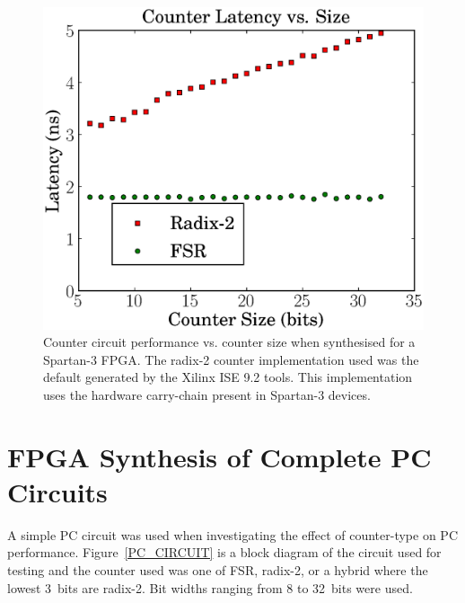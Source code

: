 \documentclass[5p, twocolumn]{elsarticle}
\begin{document}
\begin{figure}[ht!]
\begin{center}
\includegraphics[width=\linewidth]{graphs/counter_performance.eps}
\caption[Counter performance vs. counter size]{Counter
circuit performance vs. counter size when synthesised for a Spartan-3 FPGA.
The radix-2 counter implementation used was the default generated by the
Xilinx ISE 9.2 tools. This implementation uses the hardware carry-chain
present in Spartan-3 devices.}
\label{GRAPH_COUNTERS}
\end{center}
\end{figure}



%
\section{FPGA Synthesis of Complete PC Circuits}

A simple PC circuit was used when investigating the effect of counter-type on PC
performance. Figure~\ref{PC_CIRCUIT} is a block diagram of the circuit used for
testing and the counter used was one of FSR, radix-2, or a hybrid where the
lowest 3~bits are radix-2. Bit widths ranging from 8 to 32~bits were used.
\end{document}
